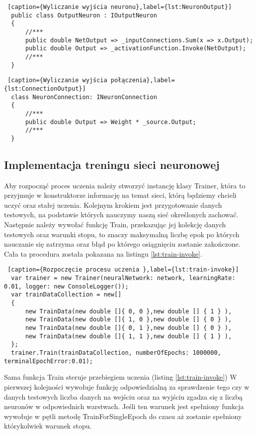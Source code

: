 \begin{lstlisting} [caption={Wyliczanie wyjścia neuronu},label={lst:NeuronOutput}]
  public class OutputNeuron : IOutputNeuron
  {
      //***
      public double NetOutput => _inputConnections.Sum(x => x.Output);
      public double Output => _activationFunction.Invoke(NetOutput);
      //***
  }
\end{lstlisting}


\begin{lstlisting} [caption={Wyliczanie wyjścia połączenia},label={lst:ConnectionOutput}]
  class NeuronConnection: INeuronConnection
  {
      //***
      public double Output => Weight * _source.Output;
      //***
  }
\end{lstlisting}

\subsection{Implementacja treningu sieci neuronowej}

Aby rozpocząć proces uczenia należy stworzyć instancję klasy Trainer, która to przyjmuje w konstruktorze
informację na temat sieci, którą będziemy chcieli uczyć oraz stałej uczenia. 
Kolejnym krokiem jest przygotowanie danych testowych, na podstawie których nauczymy naszą sieć określonych zachować.
Następnie należy wywołać funkcję Train, przekazując jej kolekcję danych testowych oraz warunki stopu,
to znaczy maksymalną liczbę epok po których nauczanie się zatrzyma oraz błąd po którego osiągnięciu zostanie zakończone.
Cała ta procedura została pokazana na listingu \ref{lst:train-invoke}.


\begin{lstlisting} [caption={Rozpoczęcie procesu uczenia },label={lst:train-invoke}]
  var trainer = new Trainer(neuralNetwork: network, learningRate: 0.01, logger: new ConsoleLogger());
  var trainDataCollection = new[]
  {
      new TrainData(new double []{ 0, 0 },new double [] { 1 } ),
      new TrainData(new double []{ 1, 0 },new double [] { 0 } ),
      new TrainData(new double []{ 0, 1 },new double [] { 0 } ),
      new TrainData(new double []{ 1, 1 },new double [] { 1 } ),
  };
  trainer.Train(trainDataCollection, numberOfEpochs: 1000000, terminalEpochError:0.01);
\end{lstlisting}

Sama funkcja Train steruje przebiegiem uczenia (listing \ref{lst:train-invoke})
W pierwszej kolejności wywołuje funkcję odpowiedzialną za sprawdzenie tego czy w danych testowych liczba danych na wejściu oraz na wyjściu zgadza się z liczbą neuronów w odpowiednich warstwach.
Jeśli ten warunek jest spełniony funkcja wywołuje w pętli metodę TrainForSingleEpoch do czasu aż zostanie spełniony którykolwiek warunek stopu.

